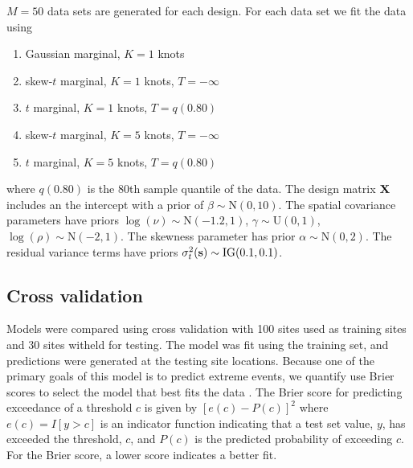 \documentclass[11pt]{article}
\begin{document}
$M = 50$ data sets are generated for each design.
For each data set we fit the data using
\begin{enumerate} \setlength{\itemsep}{-0.5em}
  \item Gaussian marginal, $K=1$ knots
  \item skew-$t$ marginal, $K=1$ knots, $T=-\infty$
  \item $t$ marginal, $K=1$ knots, $T=q(0.80)$
  \item skew-$t$ marginal, $K=5$ knots, $T=-\infty$
  \item $t$ marginal, $K=5$ knots, $T=q(0.80)$
\end{enumerate}
where $q(0.80)$ is the 80th sample quantile of the data.
The design matrix $\mbox{\bf X}$ includes an the intercept with a prior of $\beta \sim \text{N}(0, 10)$.
The spatial covariance parameters have priors $\log(\nu) \sim \text{N}(-1.2, 1)$, $\gamma \sim \text{U}(0, 1)$, $\log(\rho) \sim \text{N}(-2, 1)$.
The skewness parameter has prior $\alpha \sim \text{N}(0, 2)$.
The residual variance terms have priors $\sigma^2_t(\mbox{\bf s}) \sim \text{IG}(0.1, 0.1)$.

\subsection{Cross validation}\label{s:modelselect}
Models were compared using cross validation with 100 sites used as training sites and 30 sites witheld for testing.
The model was fit using the training set, and predictions were generated at the testing site locations.
Because one of the primary goals of this model is to predict extreme events, we quantify use Brier scores to select the model that best fits the data \citep{Gneiting2007}.
The Brier score for predicting exceedance of a threshold $c$ is given by $[e(c) - P(c)]^2$ where $e(c) = I[y>c]$ is an indicator function indicating that a test set value, $y$, has exceeded the threshold, $c$, and $P(c)$ is the predicted probability of exceeding $c$.
For the Brier score, a lower score indicates a better fit.
\end{document}
